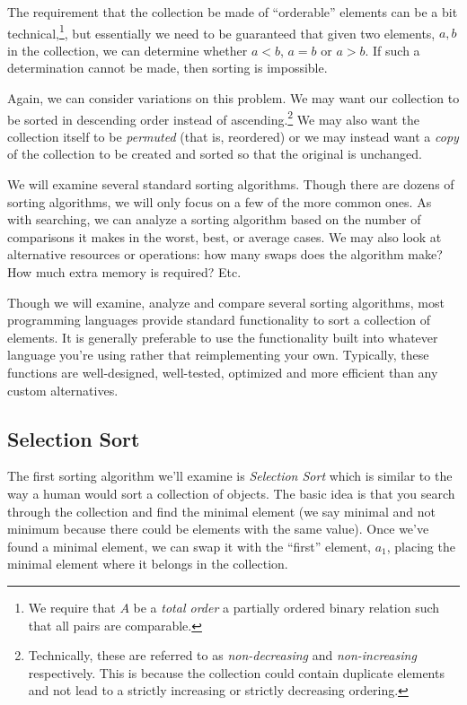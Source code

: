 The requirement that the collection be made of ``orderable'' elements can be
a bit technical,\footnote{We require that $A$ be a \emph{total order} a 
partially ordered binary relation such that all pairs are comparable.}, but essentially 
we need to be guaranteed that given two elements, $a, b$ in the collection, 
we can determine whether $a < b$, $a = b$ or $a > b$.  If such a determination
cannot be made, then sorting is impossible.

Again, we can consider variations on this problem.  We may want our collection
to be sorted in descending order instead of ascending.\footnote{Technically, these are
referred to as \emph{non-decreasing} and \emph{non-increasing} respectively.  
This is because the collection could contain duplicate elements and not lead
to a strictly increasing or strictly decreasing ordering.} We may also want
the collection itself to be \emph{permuted} (that is, reordered) or we may
instead want a \emph{copy} of the collection to be created and sorted so that
the original is unchanged.

We will examine several standard sorting algorithms. Though there are dozens
of sorting algorithms, we will only focus on a few of the more common ones.  
As with 
searching, we can analyze a sorting algorithm based on the number of 
comparisons it makes in the worst, best, or average cases.  We may also look
at alternative resources or operations: how many swaps does the algorithm make?
How much extra memory is required?  Etc.

Though we will examine, analyze and compare several sorting algorithms, most
programming languages provide standard functionality to sort a collection of
elements.  It is generally preferable to use the functionality built into 
whatever language you're using rather that reimplementing your own.  Typically, 
these functions are well-designed, well-tested, optimized and more efficient
than any custom alternatives.

\subsection{Selection Sort}

The first sorting algorithm we'll examine is \emph{Selection Sort} which is
similar to the way a human would sort a collection of objects.  The basic idea
is that you search through the collection and find the minimal element 
(we say minimal and not minimum because there could be elements with the
same value).  Once we've found a minimal element, we can swap it with the
``first'' element, $a_1$, placing the minimal element where it belongs in
the collection.  

